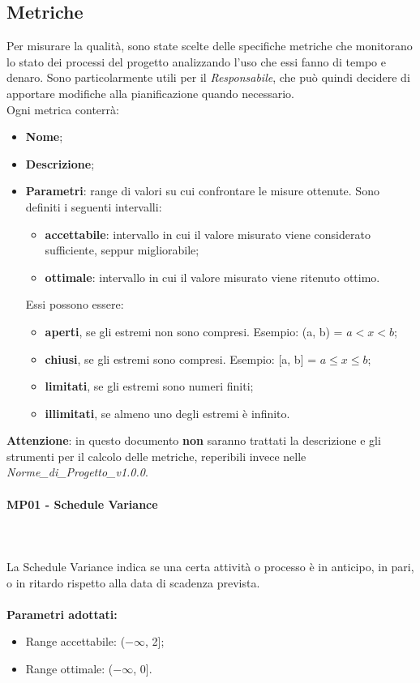 \subsection{Metriche}
Per misurare la qualità, sono state scelte delle specifiche metriche che monitorano lo stato dei processi del progetto analizzando l’uso che essi fanno di tempo e denaro. Sono particolarmente utili per il \textit{Responsabile}, che può quindi decidere di apportare modifiche alla pianificazione quando necessario.\\
Ogni metrica conterrà:
\begin{itemize}
\item \textbf{Nome};
\item \textbf{Descrizione};
\item \textbf{Parametri}: range di valori su cui confrontare le misure ottenute. Sono definiti i seguenti intervalli: \begin{itemize}
\item \textbf{accettabile}: intervallo in cui il valore misurato viene considerato sufficiente, seppur migliorabile;
\item \textbf{ottimale}: intervallo in cui il valore misurato viene ritenuto ottimo.
\end{itemize}
Essi possono essere: \begin{itemize}
\item \textbf{aperti}, se gli estremi non sono compresi. Esempio: (a, b) = $a < x < b$; 
\item \textbf{chiusi}, se gli estremi sono compresi. Esempio: [a, b] = $a \leq x \leq b$;
\item \textbf{limitati}, se gli estremi sono numeri finiti;
\item \textbf{illimitati}, se almeno uno degli estremi è infinito.
\end{itemize}
\end{itemize}
\textbf{Attenzione}: in questo documento \textbf{non} saranno trattati la descrizione e gli strumenti per il calcolo delle metriche, reperibili invece nelle \textit{Norme\_di\_Progetto\_v1.0.0}.

\paragraph{MP01 - Schedule Variance} \mbox{} \\ \mbox{} \\
La Schedule Variance indica se una certa attività o processo è in anticipo, in pari, o in ritardo rispetto alla data di scadenza prevista. \\ \\ 
\textbf{Parametri adottati:} 
\begin{itemize}
\item Range accettabile: ($ -\infty $, 2];
\item Range ottimale: ($ -\infty $, 0].
\end{itemize}


